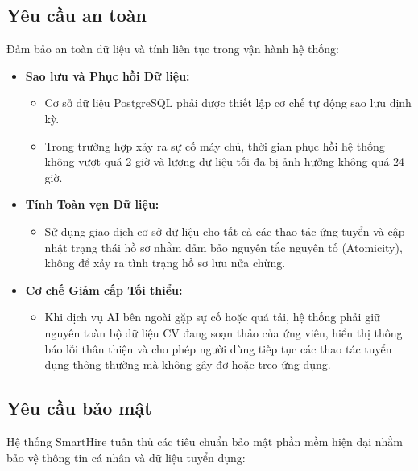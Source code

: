 \subsection{Yêu cầu an toàn}

Đảm bảo an toàn dữ liệu và tính liên tục trong vận hành hệ thống:

\begin{itemize}
    \item \textbf{Sao lưu và Phục hồi Dữ liệu:}
    \begin{itemize}
        \item Cơ sở dữ liệu PostgreSQL phải được thiết lập cơ chế tự động sao lưu định kỳ.
        \item Trong trường hợp xảy ra sự cố máy chủ, thời gian phục hồi hệ thống không vượt quá 2 giờ và lượng dữ liệu tối đa bị ảnh hưởng không quá 24 giờ.
    \end{itemize}

    \item \textbf{Tính Toàn vẹn Dữ liệu:}
    \begin{itemize}
        \item Sử dụng giao dịch cơ sở dữ liệu cho tất cả các thao tác ứng tuyển và cập nhật trạng thái hồ sơ nhằm đảm bảo nguyên tắc nguyên tố (Atomicity), không để xảy ra tình trạng hồ sơ lưu nửa chừng.
    \end{itemize}

    \item \textbf{Cơ chế Giảm cấp Tối thiểu:}
    \begin{itemize}
        \item Khi dịch vụ AI bên ngoài gặp sự cố hoặc quá tải, hệ thống phải giữ nguyên toàn bộ dữ liệu CV đang soạn thảo của ứng viên, hiển thị thông báo lỗi thân thiện và cho phép người dùng tiếp tục các thao tác tuyển dụng thông thường mà không gây đơ hoặc treo ứng dụng.
    \end{itemize}
\end{itemize}

\subsection{Yêu cầu bảo mật}

Hệ thống SmartHire tuân thủ các tiêu chuẩn bảo mật phần mềm hiện đại nhằm bảo vệ thông tin cá nhân và dữ liệu tuyển dụng:

